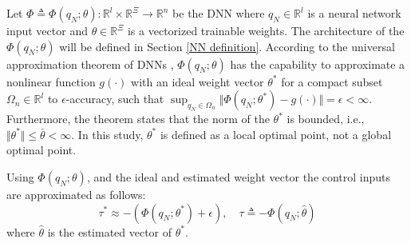 \documentclass[lettersize,journal]{IEEEtran}
\begin{document}
Let $\Phi\triangleq\Phi(q_N;\theta): \mathbb{R}^{l}\times\mathbb{R}^{\Xi}\to\mathbb{R}^{n}$ be the DNN where $q_N\in\mathbb{R}^{l}$ is a neural network input vector and $\theta\in\mathbb{R}^{\Xi}$ is a vectorized trainable weights.
The architecture of the $\Phi(q_N;\theta)$ will be defined in Section \ref{NN definition}.
According to the universal approximation theorem of DNNs \cite{RN33}, $\Phi(q_N;\theta)$ has the capability to approximate a nonlinear function $g(\cdot)$ with an ideal weight vector $\theta^*$ for a compact subset $\Omega_n\in\mathbb{R}^{l}$ to $\epsilon$-accuracy, such that $\sup_{q_N\in\Omega_n}\Vert \Phi(q_N;\theta^*) - g(\cdot) \Vert = \epsilon < \infty$.
Furthermore, the theorem states that the norm of the $\theta^*$ is bounded, i.e., $\Vert\theta^*\Vert\le \bar\theta<\infty$.
In this study, $\theta^*$ is defined as a local optimal point, not a global optimal point.

Using $\Phi(q_N;\theta)$, and the ideal and estimated weight vector the control inputs are approximated as follows:
\begin{equation}
    \tau^*\approx -
    (
        \Phi(q_N;\theta^*)+\epsilon
    )
    ,\quad 
    \tau \triangleq -\Phi(q_N;\hat\theta)
    \label{eq. approximated control}
\end{equation}
where $\hat\theta$ is the estimated vector of $\theta^*$.
\end{document}
